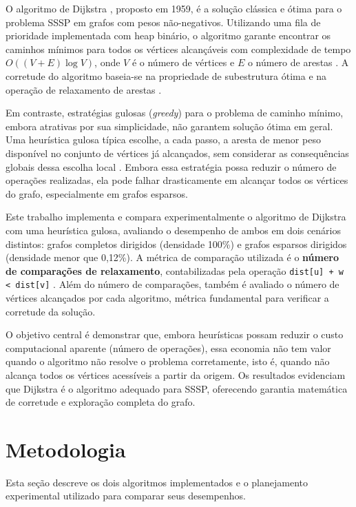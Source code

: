 \documentclass[12pt,a4paper]{article}
\begin{document}
O algoritmo de Dijkstra \cite{cormen2012}, proposto em 1959, é a solução clássica e ótima para o problema SSSP em grafos com pesos não-negativos. Utilizando uma fila de prioridade implementada com heap binário, o algoritmo garante encontrar os caminhos mínimos para todos os vértices alcançáveis com complexidade de tempo $O((V + E) \log V)$, onde $V$ é o número de vértices e $E$ o número de arestas \cite{ziviani2013}. A corretude do algoritmo baseia-se na propriedade de subestrutura ótima e na operação de relaxamento de arestas \cite{campos2010}.

Em contraste, estratégias gulosas (\textit{greedy}) para o problema de caminho mínimo, embora atrativas por sua simplicidade, não garantem solução ótima em geral. Uma heurística gulosa típica escolhe, a cada passo, a aresta de menor peso disponível no conjunto de vértices já alcançados, sem considerar as consequências globais dessa escolha local \cite{cormen2012}. Embora essa estratégia possa reduzir o número de operações realizadas, ela pode falhar drasticamente em alcançar todos os vértices do grafo, especialmente em grafos esparsos.

Este trabalho implementa e compara experimentalmente o algoritmo de Dijkstra com uma heurística gulosa, avaliando o desempenho de ambos em dois cenários distintos: grafos completos dirigidos (densidade 100\%) e grafos esparsos dirigidos (densidade menor que 0,12\%). A métrica de comparação utilizada é o \textbf{número de comparações de relaxamento}, contabilizadas pela operação \texttt{dist[u] + w < dist[v]} \cite{ziviani2013}. Além do número de comparações, também é avaliado o número de vértices alcançados por cada algoritmo, métrica fundamental para verificar a corretude da solução.

O objetivo central é demonstrar que, embora heurísticas possam reduzir o custo computacional aparente (número de operações), essa economia não tem valor quando o algoritmo não resolve o problema corretamente, isto é, quando não alcança todos os vértices acessíveis a partir da origem. Os resultados evidenciam que Dijkstra é o algoritmo adequado para SSSP, oferecendo garantia matemática de corretude e exploração completa do grafo.

\section{Metodologia}

Esta seção descreve os dois algoritmos implementados e o planejamento experimental utilizado para comparar seus desempenhos.
\end{document}
